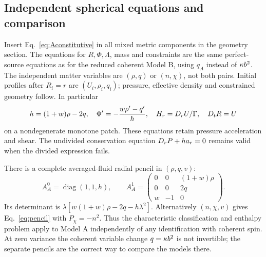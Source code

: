 \subsection{Independent spherical equations and comparison}
Insert Eq.~\eqref{eq:Aconstitutive} in all mixed metric components in the geometry section. The equations for $R,\Phi,\Lambda$, mass and constraints are the same perfect-source equations as for the reduced coherent Model B, using $q_A$ instead of $\kappa b^2$. The independent matter variables are $(\rho,q)$ or $(n,\chi)$, not both pairs. Initial profiles after $R_i=r$ are $(U_i,\rho_i,q_i)$; pressure, effective density and constrained geometry follow. In particular
\begin{equation}
 h=(1+w)\rho-2q,\quad
 \Phi'=-\frac{w\rho'-q'}h,\quad
 H_r=D_r U/\Gamma,\quad D_t R=U
\end{equation}
on a nondegenerate monotone patch. These equations retain pressure acceleration and shear. The undivided conservation equation $D_r P+h a_r=0$ remains valid when the divided expression fails.

There is a complete averaged-fluid radial pencil in $(\rho,q,v)$:
\begin{equation}
 A_A^0=\operatorname{diag}(1,1,h),\qquad
 A_A^1=\begin{pmatrix}0&0&(1+w)\rho\\0&0&2q\\w&-1&0\end{pmatrix}.
\end{equation}
Its determinant is $\lambda[w(1+w)\rho-2q-h\lambda^2]$. Alternatively $(n,\chi,v)$ gives Eq.~\eqref{eq:pencil} with $P_\chi=-n^2$. Thus the characteristic classification and enthalpy problem apply to Model A independently of any identification with coherent spin. At zero variance the coherent variable change $q=\kappa b^2$ is not invertible; the separate pencils are the correct way to compare the models there.

